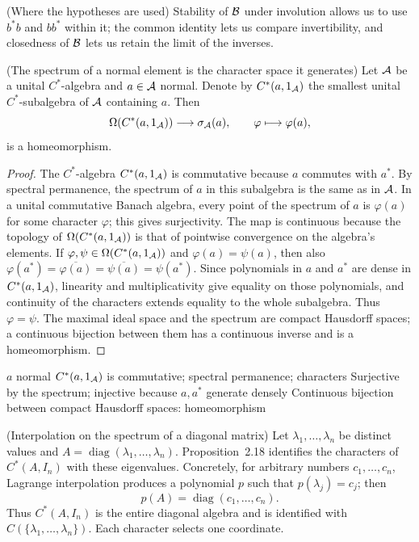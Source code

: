\begin{cthnota}{(Where the hypotheses are used)}
Stability of $\mathcal B$ under involution allows us to use $b^*b$ and $bb^*$ within it;
the common identity lets us compare invertibility, and closedness of $\mathcal B$
lets us retain the limit of the inverses.
\end{cthnota}


\begin{cthproposicion}{(The spectrum of a normal element is the character space it generates)}
Let $\mathcal A$ be a unital $C^*$-algebra and $a\in\mathcal A$ normal. Denote by
$C^*(a,1_\mathcal A)$ the smallest unital $C^*$-subalgebra of $\mathcal A$ containing $a$. Then
\[
 \Omega(C^*(a,1_\mathcal A))\longrightarrow\sigma_\mathcal A(a),\qquad
 \varphi\longmapsto\varphi(a),
\]
is a homeomorphism.
\end{cthproposicion}

\begin{proof}[Proof]
The $C^*$-algebra $C^*(a,1_\mathcal A)$ is commutative because $a$ commutes with
$a^*$. By spectral permanence, the spectrum of $a$ in this subalgebra
is the same as in $\mathcal A$. In a unital commutative Banach algebra, every point
of the spectrum of $a$ is $\varphi(a)$ for some character $\varphi$; this gives
surjectivity. The map is continuous because the topology of
$\Omega(C^*(a,1_\mathcal A))$ is that of pointwise convergence on the algebra's
elements. If $\varphi,\psi\in\Omega(C^*(a,1_\mathcal A))$ and
$\varphi(a)=\psi(a)$, then also
$\varphi(a^*)=\overline{\varphi(a)}=\overline{\psi(a)}=\psi(a^*)$.
Since polynomials in $a$ and $a^*$ are dense in $C^*(a,1_\mathcal A)$,
linearity and multiplicativity give equality on those polynomials, and
continuity of the characters extends equality to the whole subalgebra.
Thus $\varphi=\psi$. The maximal ideal space and the spectrum are compact
Hausdorff spaces; a continuous bijection between them has a continuous
inverse and is a homeomorphism.
\end{proof}

\proofdiagram
{$a$ normal}
{$C^*(a,1_\mathcal A)$ is commutative; spectral permanence; characters}
{Surjective by the spectrum; injective because $a,a^*$ generate densely}
{Continuous bijection between compact Hausdorff spaces: homeomorphism}

\begin{cthejemplo}{(Interpolation on the spectrum of a diagonal matrix)}
Let $\lambda_1,\ldots,\lambda_n$ be distinct values and
$A=\operatorname{diag}(\lambda_1,\ldots,\lambda_n)$.
Proposition~2.18 identifies the characters of $C^*(A,I_n)$ with these
eigenvalues. Concretely, for arbitrary numbers $c_1,\ldots,c_n$,
Lagrange interpolation produces a polynomial $p$ such that
$p(\lambda_j)=c_j$; then
\[
 p(A)=\operatorname{diag}(c_1,\ldots,c_n).
\]
Thus $C^*(A,I_n)$ is the entire diagonal algebra and is identified with
$C(\{\lambda_1,\ldots,\lambda_n\})$. Each character selects one coordinate.
\end{cthejemplo}

